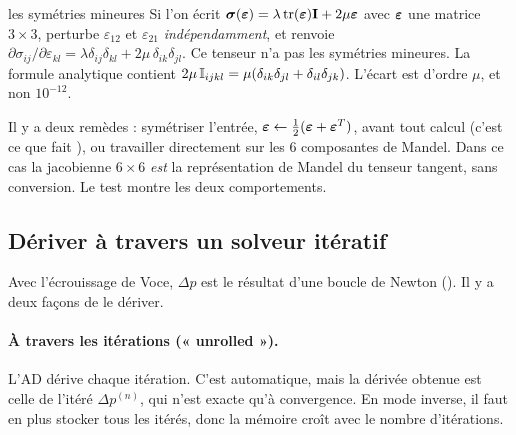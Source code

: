 \begin{piege}{les symétries mineures}
Si l'on écrit $\boldsymbol{\sigma}(\boldsymbol{\varepsilon})=\lambda\operatorname{tr}(\boldsymbol{\varepsilon})\mathbf{I}+2\mu\boldsymbol{\varepsilon}$ avec $\boldsymbol{\varepsilon}$ une matrice $3\times3$,  perturbe $\varepsilon_{12}$ et $\varepsilon_{21}$ \emph{indépendamment}, et renvoie $\partial\sigma_{ij}/\partial\varepsilon_{kl}=\lambda\delta_{ij}\delta_{kl}+2\mu\,\delta_{ik}\delta_{jl}$. Ce tenseur n'a pas les symétries mineures. La formule analytique contient $2\mu\,\mathbb{I}_{ijkl}=\mu(\delta_{ik}\delta_{jl}+\delta_{il}\delta_{jk})$. L'écart est d'ordre $\mu$, et non $10^{-12}$.
\end{piege}
Il y a deux remèdes : symétriser l'entrée, $\boldsymbol{\varepsilon}\leftarrow\frac12(\boldsymbol{\varepsilon}+\boldsymbol{\varepsilon}^T)$, avant tout calcul (c'est ce que fait ), ou travailler directement sur les 6 composantes de Mandel. Dans ce cas la jacobienne $6\times6$ \emph{est} la représentation de Mandel du tenseur tangent, sans conversion. Le test  montre les deux comportements.

\subsection{Dériver à travers un solveur itératif}\label{sec:implicit}

Avec l'écrouissage de Voce, $\Delta p$ est le résultat d'une boucle de Newton (). Il y a deux façons de le dériver.

\paragraph{À travers les itérations (« unrolled »).} L'AD dérive chaque itération. C'est automatique, mais la dérivée obtenue est celle de l'itéré $\Delta p^{(n)}$, qui n'est exacte qu'à convergence. En mode inverse, il faut en plus stocker tous les itérés, donc la mémoire croît avec le nombre d'itérations.

